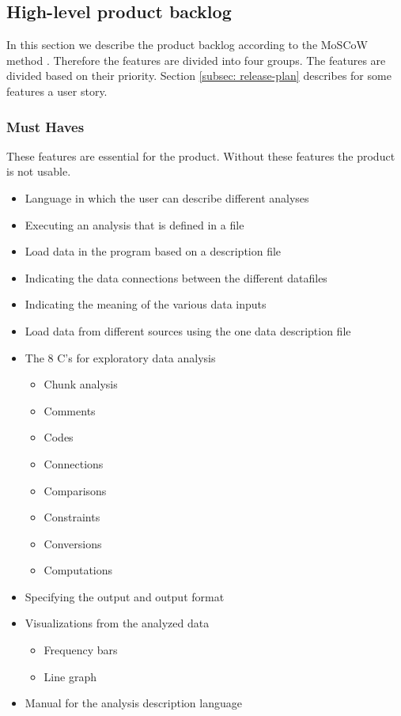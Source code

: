 \subsection{High-level product backlog}
\label{subsec: MoSCoW}
In this section we describe the product backlog according to the MoSCoW method \cite{moscowref}. Therefore the features are divided into four groups. The features are divided based on their priority. Section \ref{subsec: release-plan} describes for some features a user story.
\subsubsection{Must Haves}
These features are essential for the product. Without these features the product is not usable.
\begin{itemize}
  \item Language in which the user can describe different analyses
  \item Executing an analysis that is defined in a file
  \item Load data in the program based on a description file
  \item Indicating the data connections between the different datafiles
  \item Indicating the meaning of the various data inputs
  \item Load data from different sources using the one data description file
  \item The 8 C's for exploratory data analysis
  \begin{itemize}
    \item Chunk analysis
    \item Comments
    \item Codes 
    \item Connections
    \item Comparisons
    \item Constraints
    \item Conversions
    \item Computations
  \end{itemize}
  \item Specifying the output and output format
  \item Visualizations from the analyzed data
  \begin{itemize}
  	\item Frequency bars
    \item Line graph
  \end{itemize}
  \item Manual for the analysis description language
\end{itemize}

